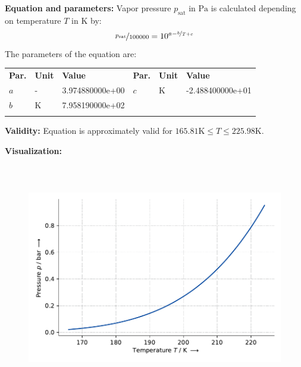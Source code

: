 \textbf{Equation and parameters:}
\newline
%
Vapor pressure $p_\mathrm{sat}$ in $\si{\pascal}$ is calculated depending on temperature $T$ in $\si{\kelvin}$ by:
%
\begin{equation*}
\nicefrac{p_\mathrm{sat}}{100000} = 10^{a - \nicefrac{b}{T + c}}
\end{equation*}
%
The parameters of the equation are:
%
\begin{longtable}[l]{lll|lll}
\toprule
\addlinespace
\textbf{Par.} & \textbf{Unit} & \textbf{Value} &	\textbf{Par.} & \textbf{Unit} & \textbf{Value} \\
\addlinespace
\midrule
\endhead

\bottomrule
\endfoot
\bottomrule
\endlastfoot
\addlinespace

$a$ & - & 3.974880000e+00 & $c$ & $\si{\kelvin}$  & -2.488400000e+01 \\
$b$ & $\si{\kelvin}$ & 7.958190000e+02 & & & \\

\addlinespace\end{longtable}

\textbf{Validity:}
\newline
Equation is approximately valid for $165.81 \si{\kelvin} \leq T \leq 225.98 \si{\kelvin}$.
\newline

\textbf{Visualization:}
%
\begin{figure}[!htp]
{\noindent\includegraphics[height=10cm, keepaspectratio]{figs/ref/ref_Propylene_VaporPressure_Antoine_1.pdf}}
\end{figure}
%

